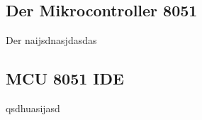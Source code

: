 \subsection{Der Mikrocontroller 8051}
	Der naijsdnasjdasdas
	
\subsection{MCU 8051 IDE}
qsdhuasijasd